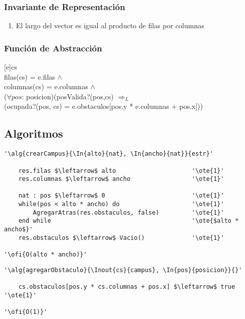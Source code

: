 \subsubsection{Invariante de Representación}

\renewcommand{\labelenumi}{(\Roman{enumi})}

\begin{enumerate}
	\item{El largo del vector es igual al producto de filas por columnas}
\end{enumerate}

\mbox{}

\subsubsection{Funci\'on de Abstracci\'on}

[e]{cs}{
	\\
	filas(cs) = e.filas $\land$ \\
	columnas(cs) = e.columnas $\land$ \\
	($\forall pos$: posicion)(posValida?(pos,cs) $\Rightarrow_L$ 
	\\ \- \- \- \- (ocupada?(pos, cs) = e.obstaculos[pos.y * e.columnas + pos.x]))
}

\subsection{Algoritmos}

\lstset{style=alg}

\begin{lstlisting}[mathescape]
'\alg{crearCampus}{\In{alto}{nat}, \In{ancho}{nat}}{estr}'
	
    res.filas $\leftarrow$ alto 					'\ote{1}'
    res.columnas $\leftarrow$ ancho 				'\ote{1}'

    nat : pos $\leftarrow$ 0 						'\ote{1}'
    while(pos < alto * ancho) do 					'\ote{1}'
    	AgregarAtras(res.obstaculos, false)			'\ote{1}'
    end while										'\ote{$alto * ancho$}'
    res.obstaculos $\leftarrow$ Vacio() 			'\ote{1}'
    
'\ofi{O(alto * ancho)}'
\end{lstlisting}

\begin{lstlisting}[mathescape]
'\alg{agregarObstaculo}{\Inout{cs}{campus}, \In{pos}{posicion}}{}'

	cs.obstaculos[pos.y * cs.columnas + pos.x] $\leftarrow$ true '\ote{1}'	

'\ofi{O(1)}'
\end{lstlisting}

